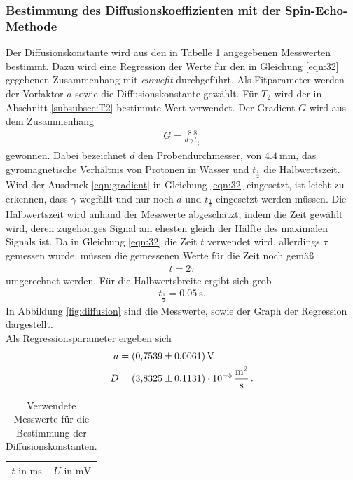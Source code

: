 \subsubsection{Bestimmung des Diffusionskoeffizienten mit der Spin-Echo-Methode}
\label{subsec:D}
Der Diffusionskonstante wird aus den in Tabelle \ref{tab:diffusion} angegebenen
Messwerten bestimmt.
Dazu wird eine Regression der Werte für den in Gleichung \eqref{eqn:32} gegebenen Zusammenhang mit
\textit{curvefit} durchgeführt.
Als Fitparameter werden der Vorfaktor $a$ sowie die Diffusionskonstante gewählt. Für $T_{2}$ wird der in Abschnitt
\ref{subsubsec:T2} bestimmte Wert verwendet. Der Gradient $G$ wird aus dem Zusammenhang
\begin{align}
  \label{eqn:gradient}
  G = \frac{8.8}{d \, \gamma \, t_{\frac{1}{2}}}
\end{align}
gewonnen. Dabei bezeichnet $d$ den Probendurchmesser, von $\SI{4.4}{\milli\meter}$, \gamma das gyromagnetische Verhältnis
von Protonen in Wasser und $t_{\frac{1}{2}}$ die Halbwertszeit.
Wird der Ausdruck \eqref{eqn:gradient} in Gleichung \eqref{eqn:32} eingesetzt, ist leicht zu erkennen, dass $\gamma$ wegfällt und nur noch $d$ und $t_{\frac{1}{2}}$ eingesetzt werden müssen.
Die Halbwertszeit wird anhand der Messwerte abgeschätzt, indem die Zeit gewählt wird, deren zugehöriges Signal am ehesten
gleich der Hälfte des maximalen Signals ist.
Da in Gleichung \eqref{eqn:32} die Zeit $t$ verwendet wird, allerdings $\tau$ gemessen wurde, müssen
die gemessenen Werte für die Zeit noch gemäß
\begin{align}
  t = 2 \tau
\end{align}
umgerechnet werden.
Für die Halbwertsbreite ergibt sich grob
\begin{align*}
  t_{\frac{1}{2}} = \SI{0.05}{\second}.
\end{align*}
In Abbildung \ref{fig:diffusion} sind die Messwerte, sowie der Graph der Regression dargestellt.\\
Als Regressionsparameter ergeben sich
\begin{align*}
  a &= \SI{0.7539+-0.0061}{\volt}\\
  D &= \SI{3.8325+-0.1131 e-5}{\meter\squared\per\second} \, .
\end{align*}

\begin{table}
  \centering
  \caption{Verwendete Messwerte für die Bestimmung der Diffusionskonstanten.}
  \label{tab:diffusion}
  \begin{tabular}{c c}
  \toprule
  $t \text{ in } \si{\milli\second}$ & $U \text{ in } \si{\milli\volt}$\\
  \midrule
  
  \bottomrule
  \end{tabular}
\end{table}



